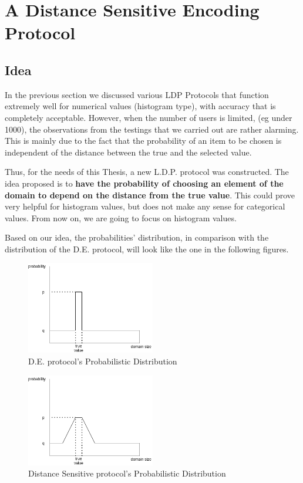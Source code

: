 \section{A Distance Sensitive Encoding Protocol}

\subsection{Idea}

In the previous section we discussed various LDP Protocols that function extremely well for numerical values (histogram type), with accuracy that is completely acceptable. However, when the number of users is limited, (eg under 1000), the observations from the testings that we carried out are rather alarming. This is mainly due to the fact that the probability of an item to be chosen is independent of the distance between the true and the selected value.


Thus, for the needs of this Thesis, a new L.D.P. protocol was constructed. The idea proposed is to \textbf{have the probability of choosing an element of the domain to depend on the distance from the true value}. This could prove very helpful for histogram values, but does not make any sense for categorical values. From now on, we are going to focus on histogram values.

Based on our idea, the probabilities' distribution, in comparison with the distribution of the D.E. protocol, will look like the one in the following figures.

\begin{figure}[!htb]\centering
    \includegraphics[width=0.5\textwidth]{images/D.E. Idea.png}
    \caption{D.E. protocol's Probabilistic Distribution}
\end{figure}

\begin{figure}[!htb]\centering
    \includegraphics[width=0.5\textwidth]{images/Our Idea.png}
    \caption{Distance Sensitive protocol's Probabilistic Distribution}
\end{figure}


